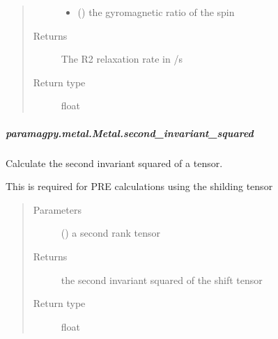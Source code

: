 \documentclass[a4paper,10pt,english]{sphinxmanual}
\begin{document}
\begin{fulllineitems}
\begin{fulllineitems}
\begin{fulllineitems}
\begin{quote}
\begin{description}
\begin{itemize}
\item {} 
 () \textendash{} the gyromagnetic ratio of the spin

\end{itemize}

\item[{Returns}] \leavevmode
{} \textendash{} The R2 relaxation rate in /s

\item[{Return type}] \leavevmode
float

\end{description}\end{quote}

\end{fulllineitems}



\subparagraph{paramagpy.metal.Metal.second\_invariant\_squared}
\label{\detokenize{reference/generated/paramagpy.metal.Metal.second_invariant_squared:paramagpy-metal-metal-second-invariant-squared}}\label{\detokenize{reference/generated/paramagpy.metal.Metal.second_invariant_squared::doc}}

\begin{fulllineitems}
\label{\detokenize{reference/generated/paramagpy.metal.Metal.second_invariant_squared:paramagpy.metal.Metal.second_invariant_squared}}
Calculate the second invariant squared of a tensor.

This is required for PRE calculations using the shilding tensor
\begin{quote}\begin{description}
\item[{Parameters}] \leavevmode
{} () \textendash{} a second rank tensor

\item[{Returns}] \leavevmode
{} \textendash{} the second invariant squared of the shift tensor

\item[{Return type}] \leavevmode
float

\end{description}\end{quote}


\end{fulllineitems}
\end{fulllineitems}
\end{fulllineitems}
\end{document}
